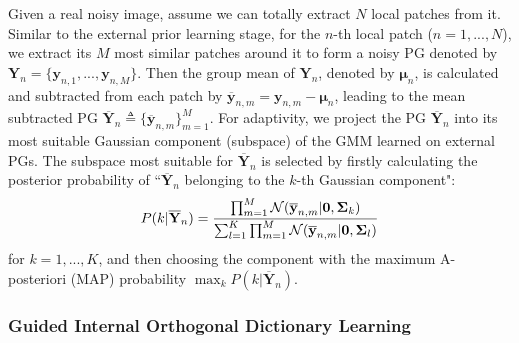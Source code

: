 \documentclass[10pt,twocolumn,letterpaper]{article}
\begin{document}
Given a real noisy image, assume we can totally extract $N$ local patches from it. Similar to the external prior learning stage, for the $n$-th local patch ($n=1,...,N$), we extract its $M$ most similar patches around it to form a noisy PG denoted by $\mathbf{Y}_{n} = \{\mathbf{y}_{n,1},...,\mathbf{y}_{n,M}\}$. Then the group mean of $\mathbf{Y}_{n}$, denoted by $\bm{\mu}_{n}$, is calculated and subtracted from each patch by $\mathbf{\overline{y}}_{n,m}=\mathbf{y}_{n,m}-\bm{\mu}_{n}$, leading to the mean subtracted PG $\mathbf{\overline{Y}}_{n}\triangleq \{\mathbf{\overline{y}}_{n,m}\}_{m=1}^{M}$. For adaptivity, we project the PG $\mathbf{\overline{Y}}_{n}$ into its most suitable Gaussian component (subspace) of the GMM learned on external PGs. The subspace most suitable for $\mathbf{\overline{Y}}_{n}$ is selected by firstly calculating the posterior probability of ``$\mathbf{\overline{Y}}_{n}$ belonging to the $k$-th Gaussian component":
\vspace{-2mm}
\begin{equation}\label{equ4}\vspace{-1mm}
P(k|\mathbf{\overline{Y}}_{n})=\frac{\prod_{m=1}^{M}\mathcal{N}(\mathbf{\overline{y}}_{n,m}|\mathbf{0},\mathbf{\Sigma}_{k})}{\sum_{l=1}^{K}\prod_{m=1}^{M}\mathcal{N}(\mathbf{\overline{y}}_{n,m}|\mathbf{0},\mathbf{\Sigma}_{l})}
\end{equation}
for $k=1,...,K$, and then choosing the component with the maximum A-posteriori (MAP) probability $\max_{k}P(k|\mathbf{\overline{Y}}_{n})$.

\vspace{-2mm}
\subsubsection{Guided Internal Orthogonal Dictionary Learning}
\vspace{-2mm}
\end{document}
